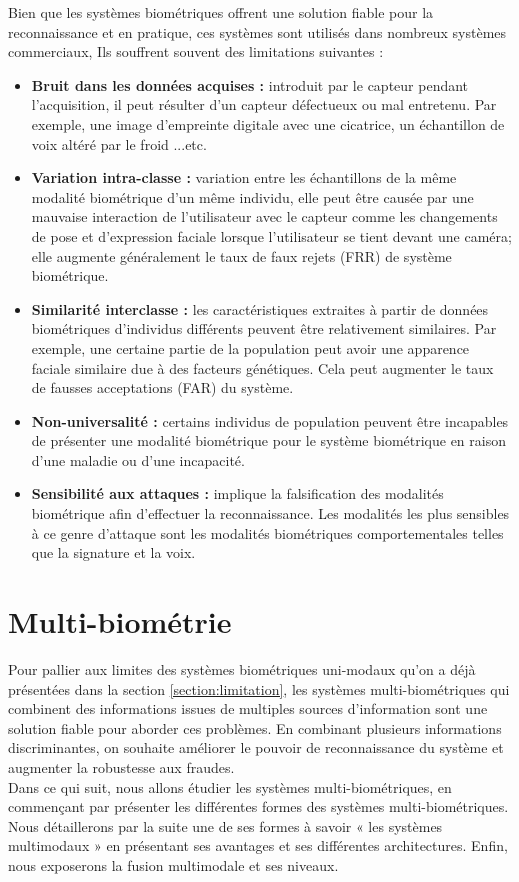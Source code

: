 Bien que les systèmes biométriques offrent une solution fiable pour la reconnaissance et en pratique, ces systèmes sont utilisés dans nombreux systèmes commerciaux, Ils souffrent souvent des limitations suivantes \citep{jain2004multibiometric} :
\begin{itemize}
	\item \textbf{Bruit dans les données acquises : }introduit par le capteur pendant l’acquisition, il peut résulter d'un capteur défectueux ou mal entretenu. Par exemple, une image d'empreinte digitale avec une cicatrice, un échantillon de voix altéré par le froid ...etc.
	\item \textbf{Variation intra-classe : }variation entre les échantillons de la même modalité biométrique d’un même individu, elle peut être causée par une mauvaise interaction de l'utilisateur avec le capteur comme les changements de pose et d'expression faciale lorsque l'utilisateur se tient devant une caméra; elle augmente généralement le taux de faux rejets (FRR) de système biométrique. 
	\item \textbf{Similarité interclasse : }les caractéristiques extraites à partir de données biométriques d'individus différents peuvent être relativement similaires. Par exemple, une certaine partie de la population peut avoir une apparence faciale similaire due à des facteurs génétiques. Cela peut augmenter le taux de fausses acceptations (FAR) du système.
	\item \textbf{Non-universalité : }certains individus de population peuvent être incapables de présenter une modalité biométrique pour le système biométrique en raison d'une maladie ou d'une incapacité. 
	\item \textbf{Sensibilité aux attaques : }implique la falsification des modalités biométrique afin d'effectuer la reconnaissance. Les modalités les plus sensibles à ce genre d'attaque sont les modalités biométriques comportementales telles que la signature et la voix.
\end{itemize}
\section{Multi-biométrie}
Pour pallier aux limites des systèmes biométriques uni-modaux qu'on a déjà présentées dans la section \ref{section:limitation}, les systèmes multi-biométriques qui combinent des informations issues de multiples sources d’information sont une solution fiable pour aborder ces problèmes. En combinant plusieurs informations discriminantes, on souhaite améliorer le pouvoir de reconnaissance du système et augmenter la robustesse aux fraudes.\\
Dans ce qui suit, nous allons étudier les systèmes multi-biométriques, en commençant par présenter les différentes formes des systèmes multi-biométriques. Nous détaillerons par la suite une de ses formes à savoir « les systèmes multimodaux » en présentant ses avantages et ses différentes architectures. Enfin, nous exposerons la fusion multimodale et ses niveaux.

